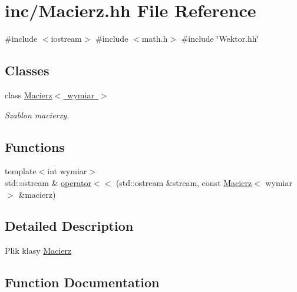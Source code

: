 \hypertarget{_macierz_8hh}{}\section{inc/\+Macierz.hh File Reference}
\label{_macierz_8hh}
{\ttfamily \#include $<$iostream$>$}\newline
{\ttfamily \#include $<$math.\+h$>$}\newline
{\ttfamily \#include \char`\"{}Wektor.\+hh\char`\"{}}\newline
\subsection*{Classes}
\begin{DoxyCompactItemize}
\item 
class \mbox{\hyperlink{class_macierz}{Macierz$<$ wymiar $>$}}
\begin{DoxyCompactList}\small\item\em Szablon macierzy. \end{DoxyCompactList}\end{DoxyCompactItemize}
\subsection*{Functions}
\begin{DoxyCompactItemize}
\item 
{\footnotesize template$<$int wymiar$>$ }\\std\+::ostream \& \mbox{\hyperlink{_macierz_8hh_abb429a27633cd5bded957e393b47428e}{operator$<$$<$}} (std\+::ostream \&stream, const \mbox{\hyperlink{class_macierz}{Macierz}}$<$ wymiar $>$ \&macierz)
\end{DoxyCompactItemize}


\subsection{Detailed Description}
Plik klasy \mbox{\hyperlink{class_macierz}{Macierz}} 

\subsection{Function Documentation}
\mbox{\label{_macierz_8hh_abb429a27633cd5bded957e393b47428e}} 
